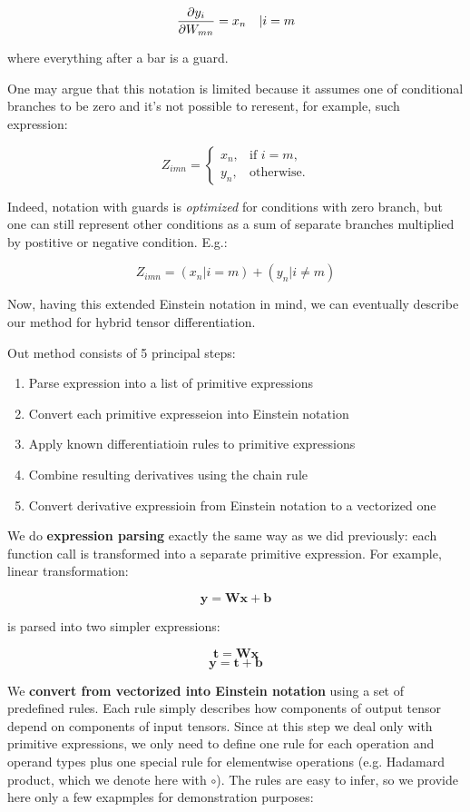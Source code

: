 \documentclass[conference]{IEEEtran}
\begin{document}
$$\pdv{y_i}{W_{mn}} = x_n \quad | i = m$$

where everything after a bar is a guard.

One may argue that this notation is limited because it assumes one of
conditional branches to be zero and it's not possible to reresent, for
example, such expression:

$$Z_{imn} = \begin{cases}
  x_n, & \text{if } i = m, \\
  y_n, & \text{otherwise}.
\end{cases}$$

Indeed, notation with guards is \textit{optimized} for conditions with
zero branch, but one can still represent other conditions as a sum of
separate branches multiplied by postitive or negative condition. E.g.:

$$Z_{imn} = (x_n | i = m) + (y_n | i \neq m)$$

Now, having this extended Einstein notation in mind, we can eventually
describe our method for hybrid tensor differentiation.

Out method consists of 5 principal steps:

\begin{enumerate}
\item Parse expression into a list of primitive expressions
\item Convert each primitive expresseion into Einstein notation
\item Apply known differentiatioin rules to primitive expressions
\item Combine resulting derivatives using the chain rule
\item Convert derivative expressioin from Einstein notation to a
  vectorized one
\end{enumerate}

We do \textbf{expression parsing} exactly the same way as we did
previously: each function call is transformed into a separate
primitive expression. For example, linear transformation:

$$\pmb{y} = \pmb{Wx} + \pmb{b}$$ 

is parsed into two simpler expressions:

$$\pmb{t} = \pmb{Wx}$$
$$\pmb{y} = \pmb{t} + \pmb{b}$$

We \textbf{convert from vectorized into Einstein notation} using a set
of predefined rules. Each rule simply describes how components of
output tensor depend on components of input tensors. Since at this
step we deal only with primitive expressions, we only need to define
one rule for each operation and operand types plus one special rule
for elementwise operations (e.g. Hadamard product, which we denote
here with $\circ$). The rules are easy to infer, so we provide here
only a few exapmples for demonstration purposes:
\end{document}
